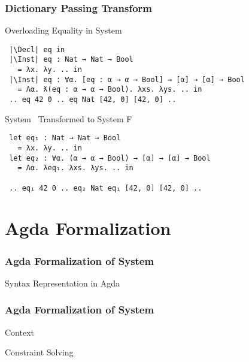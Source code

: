 \documentclass{beamer}
\begin{document}
\begin{frame}[fragile]
  \frametitle{Dictionary Passing Transform}
  \begin{block}{Overloading Equality in System \Fo\ }
    \begin{center}
      \begin{verbatim}
 |\Decl| eq in
 |\Inst| eq : Nat → Nat → Bool 
   = λx. λy. .. in
 |\Inst| eq : ∀α. [eq : α → α → Bool] ⇒ [α] → [α] → Bool 
   = Λα. ƛ(eq : α → α → Bool). λxs. λys. .. in
 .. eq 42 0 .. eq Nat [42, 0] [42, 0] .. 
      \end{verbatim}
    \end{center}
  \end{block}
  \begin{block}{System \Fo\ Transformed to System F}
    \begin{center}
      \begin{verbatim}
 let eq₁ : Nat → Nat → Bool 
   = λx. λy. .. in
 let eq₂ : ∀α. (α → α → Bool) → [α] → [α] → Bool 
   = Λα. λeq₁. λxs. λys. .. in
  
 .. eq₁ 42 0 .. eq₂ Nat eq₁ [42, 0] [42, 0] .. 
      \end{verbatim}
    \end{center}
  \end{block}
\end{frame}

\section{Agda Formalization}

\begin{frame}[fragile]
  \frametitle{Agda Formalization of System \Fo}
  \begin{block}{Syntax Representation in Agda}
    \begin{small}
      
        \FoTerm
     
    \end{small}
  \end{block}
\end{frame}

\begin{frame}[fragile]
  \frametitle{Agda Formalization of System \Fo}
  \begin{block}{Context}
    \FoCtx
  \end{block}
  \begin{block}{Constraint Solving}
    \FoCstrSolve
  \end{block}
\end{frame}
\end{document}
